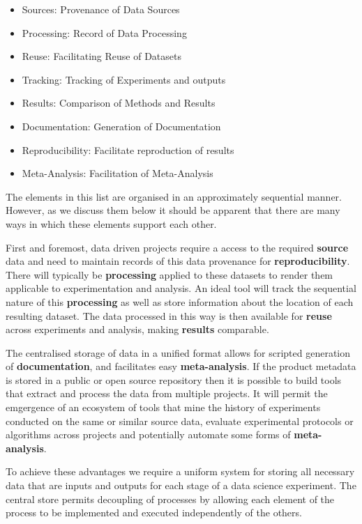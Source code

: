 \documentclass[sigconf]{acmart}
\begin{document}
\begin{itemize}
 \item Sources: Provenance of Data Sources
 \item Processing: Record of Data Processing
 \item Reuse: Facilitating Reuse of Datasets
 \item Tracking: Tracking of Experiments and outputs
 \item Results: Comparison of Methods and Results
 \item Documentation: Generation of Documentation
 \item Reproducibility: Facilitate reproduction of results
 \item Meta-Analysis: Facilitation of Meta-Analysis
\end{itemize}

The elements in this list are organised in an approximately sequential manner. However, as we discuss
them below it should be apparent that there are many ways in which these elements support each other.

First and foremost, data driven projects require a access to the required \textbf{source} data 
and need to maintain records of this data provenance for \textbf{reproducibility}. 
There will typically be \textbf{processing} applied to these datasets to 
render them applicable to experimentation and analysis. An ideal tool will track the sequential 
nature of this \textbf{processing} as well as store information about the location of each resulting dataset.
The data processed in this way is then available for \textbf{reuse} across experiments and analysis,
making \textbf{results} comparable.

The centralised storage of data in a unified format allows for scripted generation of \textbf{documentation},
and facilitates easy \textbf{meta-analysis}. If the product metadata is stored in a public or open source
repository then it is possible to build tools that extract and process the data from multiple projects. It
will permit the emgergence of an ecosystem of tools that mine the history of experiments conducted on the
same or similar source data, evaluate experimental protocols or algorithms across projects and potentially
automate some forms of \textbf{meta-analysis}.
 
To achieve these advantages we require a uniform system for storing all necessary data that are inputs and outputs 
for each stage of a data science experiment. The central store permits decoupling of processes by allowing each
element of the process to be implemented and executed independently of the others.
\end{document}
